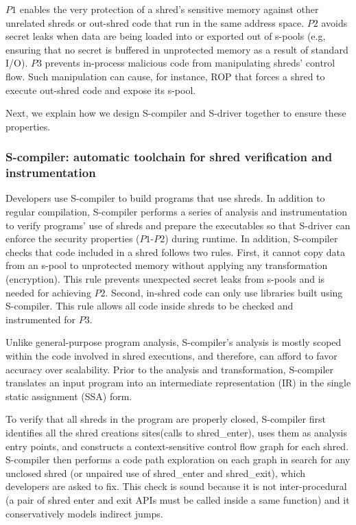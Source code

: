 $P1$ enables the very protection of a shred's sensitive memory against other unrelated shreds or out-shred code that run in the same address space. 
$P2$ avoids secret leaks when data are being loaded into or exported out of s-pools (e.g, ensuring that no secret is buffered in unprotected memory as a result of standard I/O).
$P3$ prevents in-process malicious code from manipulating shreds' control flow. Such manipulation can cause, for instance, ROP that forces a shred to execute out-shred code and expose its s-pool. 

Next, we explain how we design S-compiler and S-driver together to ensure these properties.



\subsubsection{S-compiler: automatic toolchain for shred verification and instrumentation}
Developers use S-compiler to build programs that use shreds.  
In addition to regular compilation, S-compiler performs a series of analysis and instrumentation to verify programs' use of shreds and prepare the executables so that S-driver can enforce the security properties ($P1$-$P2$) during runtime. 
In addition, S-compiler checks that code included in a shred follows two rules. 
First, it cannot copy data from an s-pool to unprotected memory without applying any transformation (\eg encryption). This rule prevents unexpected secret leaks from s-pools and is needed for achieving $P2$. 
Second, in-shred code can only use libraries built using S-compiler. This rule allows all code inside shreds to be checked and instrumented for $P3$. 

Unlike general-purpose program analysis, S-compiler's analysis is mostly scoped within the code involved in shred executions, and therefore, can afford to favor accuracy over scalability. Prior to the analysis and transformation, S-compiler translates an input program into an intermediate representation (IR) in the single static assignment (SSA) form. 

To verify that all shreds in the program are properly closed, S-compiler first identifies all the shred creations sites(\ie calls to {\btt shred\_enter}), uses them as analysis entry points, and constructs a context-sensitive control flow graph for each shred. S-compiler then performs a code path exploration on each graph in search for any unclosed shred (or unpaired use of {\btt shred\_enter} and {\btt shred\_exit}), which developers are asked to fix. This check is sound because it is not inter-procedural (\ie a pair of shred enter and exit APIs must be called inside a same function) and it conservatively models indirect jumps. 

